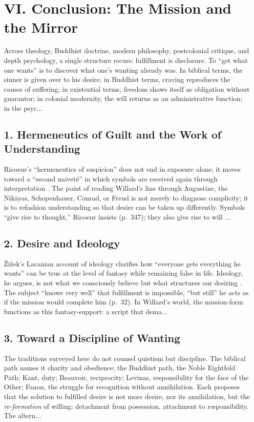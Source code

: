 \section*{VI. Conclusion: The Mission and the Mirror}

Across theology, Buddhist doctrine, modern philosophy, postcolonial critique, and depth psychology, a single structure recurs: fulfillment is disclosure. To ``get what one wants'' is to discover what one’s wanting already was. In biblical terms, the sinner is given over to his desire; in Buddhist terms, craving reproduces the causes of suffering; in existential terms, freedom shows itself as obligation without guarantor; in colonial modernity, the will returns as an administrative function; in the psyc...
\subsection*{1. Hermeneutics of Guilt and the Work of Understanding}
Ricoeur’s ``hermeneutics of suspicion'' does not end in exposure alone; it moves toward a ``second naivet{\'e}'' in which symbols are received again through interpretation \parencite{RicoeurSymbol1970}. The point of reading Willard’s line through Augustine, the Nik{\={a}}yas, Schopenhauer, Conrad, or Freud is not merely to diagnose complicity; it is to refashion understanding so that desire can be taken up differently. Symbols ``give rise to thought,'' Ricoeur insists (p.~347); they also give rise to will ...
\subsection*{2. Desire and Ideology}
{\v{Z}}i{\v{z}}ek’s Lacanian account of ideology clarifies how ``everyone gets everything he wants'' can be true at the level of fantasy while remaining false in life. Ideology, he argues, is not what we consciously believe but what structures our desiring \parencite{ZizekSublime1999}. The subject ``knows very well'' that fulfillment is impossible, ``but still'' he acts as if the mission would complete him (p.~32). In Willard’s world, the mission-form functions as this fantasy-support: a script that dema...
\subsection*{3. Toward a Discipline of Wanting}
The traditions surveyed here do not counsel quietism but discipline. The biblical path names it charity and obedience; the Buddhist path, the Noble Eightfold Path; Kant, duty; Beauvoir, reciprocity; Levinas, responsibility for the face of the Other; Fanon, the struggle for recognition without annihilation. Each proposes that the solution to fulfilled desire is not more desire, nor its annihilation, but the \emph{re-formation} of willing: detachment from possession, attachment to responsibility. The altern...
